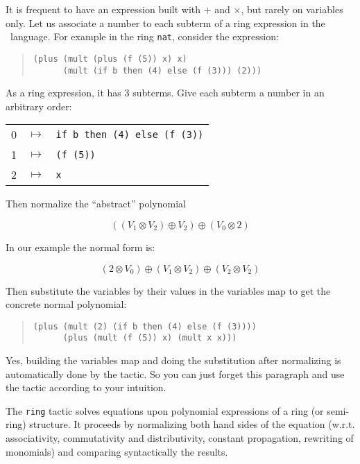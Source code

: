 It is frequent to have an expression built with + and
  $\times$, but rarely on variables only.
Let us associate a number to each subterm of a ring
expression in the \gallina\ language. For example in the ring
\texttt{nat}, consider the expression:

\begin{quotation}
\begin{verbatim}
(plus (mult (plus (f (5)) x) x)
      (mult (if b then (4) else (f (3))) (2)))
\end{verbatim}
\end{quotation}

\noindent As a ring expression, it has 3 subterms. Give each subterm a
number in an arbitrary order:

\begin{tabular}{ccl}
0 & $\mapsto$ & \verb|if b then (4) else (f (3))| \\
1 & $\mapsto$ & \verb|(f (5))| \\
2 & $\mapsto$ & \verb|x| \\
\end{tabular}

\noindent Then normalize the ``abstract'' polynomial

$$((V_1 \otimes V_2) \oplus V_2) \oplus (V_0 \otimes 2) $$

\noindent In our example the normal form is:

$$(2 \otimes V_0) \oplus (V_1 \otimes V_2) \oplus (V_2 \otimes V_2)$$

\noindent Then substitute the variables by their values in the variables map to
get the concrete normal polynomial:

\begin{quotation}
\begin{verbatim}
(plus (mult (2) (if b then (4) else (f (3))))
      (plus (mult (f (5)) x) (mult x x)))
\end{verbatim}
\end{quotation}


Yes, building the variables map and doing the substitution after
normalizing is automatically done by the tactic. So you can just forget
this paragraph and use the tactic according to your intuition.


The {\tt ring} tactic solves equations upon polynomial expressions of
a ring (or semi-ring) structure. It proceeds by normalizing both hand
sides of the equation (w.r.t. associativity, commutativity and
distributivity, constant propagation, rewriting of monomials)
and comparing syntactically the results.

